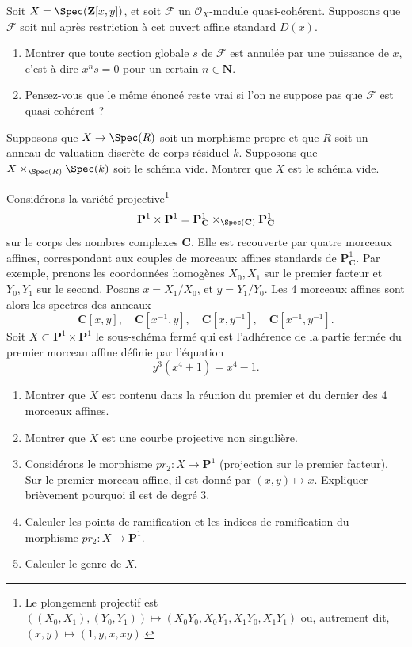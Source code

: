 \begin{exercise}
\label{exercise-kill-global-sections}
Soit $X = \Spec({\mathbf Z}[x, y])$, et soit ${\mathcal F}$ un
${\mathcal O}_X$-module quasi-cohérent.
Supposons que ${\mathcal F}$ soit nul après restriction à
cet
ouvert affine standard $D(x)$.
\begin{enumerate}
\item Montrer que toute section globale $s$ de ${\mathcal F}$ est annulée par une
puissance de $x$, c'est-à-dire $x^ns = 0$ pour un certain $n\in {\mathbf N}$.
\item Pensez-vous que le même énoncé reste vrai si l'on ne suppose pas que ${\mathcal F}$
est quasi-cohérent ?
\end{enumerate}
\end{exercise}

\begin{exercise}
\label{exercise-empty-fibre-empty}
Supposons que $X \to \Spec(R)$ soit un morphisme propre et que
$R$ soit un anneau de valuation discrète de corps résiduel $k$. Supposons que
$X \times_{\Spec(R)} \Spec(k)$ soit le schéma vide. Montrer que
$X$ est le schéma vide.
\end{exercise}

\begin{exercise}
\label{exercise-curve-p1-p1}
Considérons la
variété projective\footnote{Le plongement projectif est
$((X_0, X_1), (Y_0, Y_1))\mapsto (X_0Y_0, X_0Y_1, X_1Y_0, X_1Y_1)$
ou, autrement dit, $(x, y)\mapsto (1, y, x, xy)$.}
$$
{\mathbf P}^1 \times {\mathbf P}^1 = {\mathbf P}^1_{{\mathbf C}}
\times_{\Spec({\mathbf C})} {\mathbf P}^1_{\mathbf C}
$$
sur le corps des nombres complexes ${\mathbf C}$. Elle est recouverte par quatre morceaux
affines,
correspondant aux couples de morceaux affines standards de ${\mathbf P}^1_{\mathbf
C}$. Par exemple,
prenons les coordonnées homogènes $X_0, X_1$ sur le premier facteur et
$Y_0, Y_1$ sur le second. Posons $x = X_1/X_0$, et $y = Y_1/Y_0$. Les 4
morceaux affines sont alors les spectres des anneaux
$$
{\mathbf C}[x, y], \quad
{\mathbf C}[x^{-1}, y], \quad
{\mathbf C}[x, y^{-1}], \quad
{\mathbf C}[x^{-1}, y^{-1}].
$$
Soit $X \subset {\mathbf P}^1 \times {\mathbf P}^1$ le sous-schéma fermé
qui est
l'adhérence de la partie fermée du premier morceau affine définie par l'équation
$$
y^3(x^4 + 1) = x^4 -1.
$$
\begin{enumerate}
\item Montrer que $X$ est contenu dans la réunion du premier et
du dernier des 4 morceaux affines.
\item Montrer que $X$ est une courbe projective non singulière.
\item Considérons le morphisme $pr_2 : X \to {\mathbf P}^1$ (projection sur
le premier facteur). Sur le premier morceau affine, il est donné par $(x, y) \mapsto x$.
Expliquer brièvement pourquoi il est de degré $3$.
\item Calculer les points de ramification et les indices de ramification
du morphisme $pr_2 : X \to {\mathbf P}^1$.
\item Calculer le genre de $X$.
\end{enumerate}
\end{exercise}

